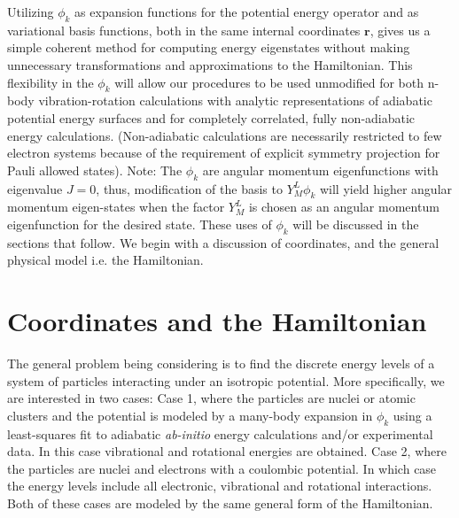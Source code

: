 \documentclass[12pt,thmsa]{article}
\begin{document}
Utilizing $\phi _k$ as expansion functions for the potential energy operator
and as variational basis functions, both in the same internal coordinates $%
\mathbf{r}$, gives us a simple coherent method for computing energy
eigenstates without making unnecessary transformations and approximations to
the Hamiltonian. This flexibility in the $\phi _k$ will allow our procedures
to be used unmodified for both n-body vibration-rotation calculations with
analytic representations of adiabatic potential energy surfaces and for
completely correlated, fully non-adiabatic energy calculations.
(Non-adiabatic calculations are necessarily restricted to few electron
systems because of the requirement of explicit symmetry projection for Pauli
allowed states). Note: The $\phi _k$ are angular momentum eigenfunctions
with eigenvalue $J=0$, thus, modification of the basis to $Y_M^L\phi _k$
will yield higher angular momentum eigen-states when the factor $Y_M^L$ is
chosen as an angular momentum eigenfunction for the desired state. These
uses of $\phi _k$ will be discussed in the sections that follow. We begin
with a discussion of coordinates, and the general physical model i.e. the
Hamiltonian.

\section{ Coordinates and the Hamiltonian}

The general problem being considering is to find the discrete energy levels
of a system of particles interacting under an isotropic potential. More
specifically, we are interested in two cases: Case 1, where the particles
are nuclei or atomic clusters and the potential is modeled by a many-body
expansion in $\phi _k$ using a least-squares fit to adiabatic \textit{%
ab-initio} energy calculations and/or experimental data. In this case
vibrational and rotational energies are obtained. Case 2, where the
particles are nuclei and electrons with a coulombic potential. In which case
the energy levels include all electronic, vibrational and rotational
interactions. Both of these cases are modeled by the same general form of
the Hamiltonian.
\end{document}
